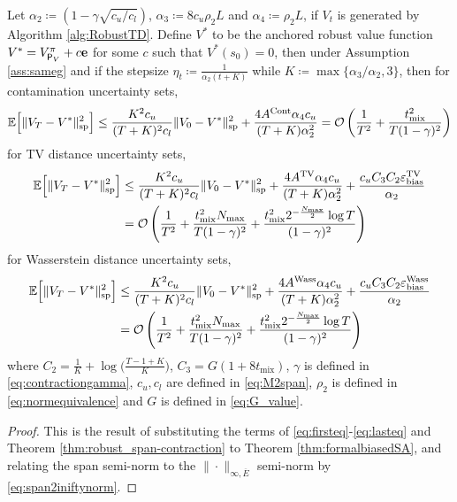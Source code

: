 \begin{theorem}\label{thm:formalVresult}
    Let $\alpha_2 \coloneqq (1-\gamma \sqrt{c_{{u}} / c_{{l}}})$, $\alpha_3 \coloneqq 8c_{{u}} \rho_2 L$ and $\alpha_4 \coloneqq \rho_2L$, if $V_t$ is generated by Algorithm \ref{alg:RobustTD}. Define $V^*$ to be the anchored robust value function $V^* =  V^\pi_{\mathsf P_V} + c \mathbf{e}$ for some $c$ such that $V^*(s_0)=0$, then under Assumption \ref{ass:sameg} and if the stepsize $\eta_t \coloneqq \frac{1}{\alpha_2(t+K)}$ while $K \coloneqq \max\{ \alpha_3/\alpha_2, 3\}$, then for contamination uncertainty sets,
    \begin{equation} 
        \mathbb{E}\Bigl[\|V_T - V^*\|^2_{\mathrm{sp}}\Bigr] \leq \frac{K^2 c_u}{(T+K)^2c_l} \|V_0 - V^*\|^2_{\mathrm{sp}} + \frac{4 A^{\mathrm{Cont}}\alpha_4 c_u}{(T+K)\alpha_2^2}=\operatorname*{\mathcal{O}}\left(\frac{1}{T^2}+\frac{t^2_{\mathrm{mix}}}{T(1-\gamma)^2}\right)
    \end{equation}
    for TV distance uncertainty sets,
    \begin{align} 
        \mathbb{E}\Bigl[\|V_T - V^*\|^2_{\mathrm{sp}}\Bigr] &\leq \frac{K^2 c_u}{(T+K)^2c_l} \|V_0 - V^*\|^2_{\mathrm{sp}} + \frac{4A^{\mathrm{TV}} \alpha_4 c_u}{(T+K)\alpha_2^2} + \frac{c_u C_3 C_2 \varepsilon^{\mathrm{TV}}_{\mathrm{bias}} }{\alpha_2} \\
        &=\operatorname*{\mathcal{O}}\left(\frac{1}{T^2}+\frac{t^2_{\mathrm{mix}}N_{\max}}{T(1-\gamma)^2} + \frac{t^2_{\mathrm{mix}}  2^{-\frac{N_{\max}}{2}}\log T}{(1-\gamma)^2}\right)
    \end{align}
    for Wasserstein distance uncertainty sets,
    \begin{align} 
        \mathbb{E}\Bigl[\|V_T - V^*\|^2_{\mathrm{sp}}\Bigr] &\leq \frac{K^2 c_u}{(T+K)^2c_l} \|V_0 - V^*\|^2_{\mathrm{sp}} + \frac{4 A^{\mathrm{Wass}} \alpha_4 c_u}{(T+K)\alpha_2^2} + \frac{c_u C_3 C_2 \varepsilon^{\mathrm{Wass}}_{\mathrm{bias}} }{\alpha_2} \\
        &=\operatorname*{\mathcal{O}}\left(\frac{1}{T^2}+\frac{t^2_{\mathrm{mix}}N_{\max}}{T(1-\gamma)^2}+\frac{t^2_{\mathrm{mix}}  2^{-\frac{N_{\max}}{2}}\log T}{(1-\gamma)^2}\right)
    \end{align}
    where $C_2 = \frac{1}{K} + \log \big(\frac{T-1+K}{K}\big)$, $C_3 = G(1+8t_{\mathrm{mix}})$, $\gamma$ is defined in \eqref{eq:contractiongamma}, $c_u,c_l$ are defined in \eqref{eq:M2span}, $\rho_2$ is defined in \eqref{eq:normequivalence} and $G$ is defined in \eqref{eq:G_value}.
\end{theorem}
\begin{proof}
    This is the result of substituting the terms of \eqref{eq:firsteq}-\eqref{eq:lasteq} and Theorem \ref{thm:robust_span-contraction} to Theorem \ref{thm:formalbiasedSA}, and relating the span semi-norm to the $\|\cdot\|_{\infty,\overline{E}}$ semi-norm by \eqref{eq:span2iniftynorm}.
\end{proof}

